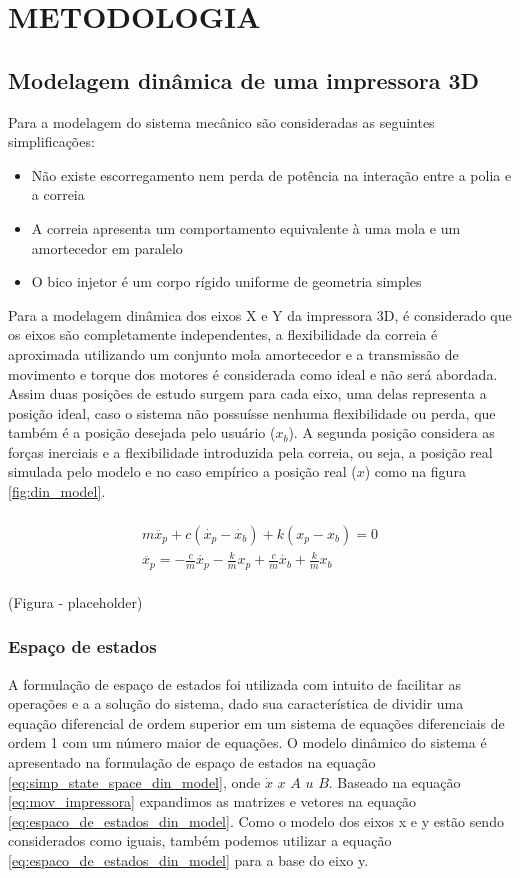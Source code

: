 \chapter{METODOLOGIA}

\section{Modelagem dinâmica de uma impressora 3D}
Para a modelagem do sistema mecânico são consideradas as seguintes simplificações:
\begin{itemize}
    \item Não existe escorregamento nem perda de potência na interação entre a polia e a correia
    \item A correia apresenta um comportamento equivalente à uma mola e um amortecedor em paralelo
    \item O bico injetor é um corpo rígido uniforme de geometria simples
\end{itemize}

Para a modelagem dinâmica dos eixos X e Y da impressora 3D, é considerado que os eixos são completamente independentes, a flexibilidade da correia é aproximada utilizando um conjunto 
mola amortecedor e a transmissão de movimento e torque dos motores é considerada como ideal e não será abordada. Assim duas posições de estudo surgem para cada eixo, uma delas representa a posição ideal, caso o sistema não possuísse nenhuma flexibilidade ou perda, que também é a posição desejada pelo usuário ($x_b$). A segunda posição considera as forças inerciais e a flexibilidade introduzida pela correia, ou seja, a posição real simulada pelo modelo e no caso empírico a posição real ($x$) como na figura \ref{fig:din_model}.

\begin{multline}
    \label{eq:mov_impressora}
    \\
    m \ddot{x_p} + c(\dot{x_p} - \dot{x_b}) + k(x_p-x_b) = 0 \\
    \ddot{x_p} = - \frac{c}{m} \dot{x_p} - \frac{k}{m} x_p + \frac{c}{m} \dot{x_b} + \frac{k}{m} x_b \\
\end{multline}

(Figura - placeholder)

\subsection{Espaço de estados}
A formulação de espaço de estados foi utilizada com intuito de facilitar as operações e a a solução do sistema, dado sua característica de dividir uma equação diferencial de ordem superior em um sistema de equações diferenciais de ordem 1 com um número maior de equações. O modelo dinâmico do sistema é apresentado na formulação de espaço de estados na equação \ref{eq:simp_state_space_din_model}, onde $\dot x$ $x$ $A$ $u$ $B$. Baseado na equação \ref{eq:mov_impressora} expandimos as matrizes e vetores na equação \ref{eq:espaco_de_estados_din_model}. Como o modelo dos eixos x e y estão sendo considerados como iguais, também podemos utilizar a equação \ref{eq:espaco_de_estados_din_model} para a base do eixo y.

